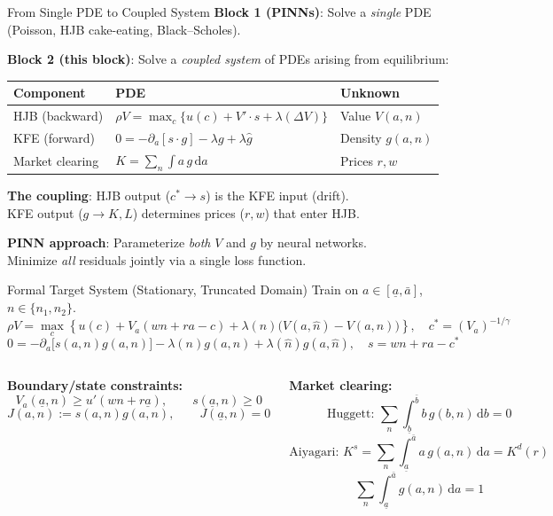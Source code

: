 \documentclass[aspectratio=169,11pt]{beamer}
\newcommand{\emphc}[1]{\textcolor{harvardcrimson}{#1}}
\newcommand{\ud}{\,\mathrm{d}}
\newcommand{\ubar}[1]{\underline{#1}}
\begin{document}
\begin{frame}{From Single PDE to Coupled System}
\small
\textbf{Block 1 (PINNs)}: Solve a \emph{single} PDE (Poisson, HJB cake-eating, Black--Scholes).

\vspace{0.2em}
\textbf{Block 2 (this block)}: Solve a \emph{coupled system} of PDEs arising from equilibrium:

\vspace{0.2em}
\begin{center}
\small
\renewcommand{\arraystretch}{1.3}
\begin{tabular}{lll}
\toprule
\textbf{Component} & \textbf{PDE} & \textbf{Unknown} \\
\midrule
HJB (backward) & $\rho V = \max_c\{u(c) + V'\cdot s + \lambda(\Delta V)\}$ & Value $V(a,n)$ \\
KFE (forward) & $0 = -\partial_a[s\cdot g] - \lambda g + \lambda\hat{g}$ & Density $g(a,n)$ \\
Market clearing & $K = \sum_n \int a\,g\ud a$ & Prices $r, w$ \\
\bottomrule
\end{tabular}
\end{center}

\vspace{0.2em}
\textbf{The coupling}: HJB output ($c^* \to s$) is the KFE input (drift).\\
KFE output ($g \to K, L$) determines prices ($r, w$) that enter HJB.

\vspace{0.2em}
\begin{center}
\colorbox{uzhgreylight}{\parbox{0.7\textwidth}{\centering\small
\textbf{PINN approach}: Parameterize \emph{both} $V$ and $g$ by neural networks.\\
Minimize \emph{all} residuals \emphc{jointly} via a single loss function.}}
\end{center}
\end{frame}

\begin{frame}{Formal Target System (Stationary, Truncated Domain)}
\footnotesize
Train on $a\in[\ubar{a},\bar{a}]$, $n\in\{n_1,n_2\}$.
\[
\rho V=\max_c\left\{u(c)+V_a(wn+ra-c)+\lambda(n)\big(V(a,\hat n)-V(a,n)\big)\right\},\quad
c^*=(V_a)^{-1/\gamma}
\]
\[
0=-\partial_a\!\big[s(a,n)g(a,n)\big]-\lambda(n)g(a,n)+\lambda(\hat n)g(a,\hat n),\quad
s=wn+ra-c^*
\]

\vspace{-0.2em}
\begin{columns}[T]
\textbf{Boundary/state constraints:}
\[
V_a(\ubar a,n)\ge u'(wn+r\ubar a),\qquad s(\ubar a,n)\ge 0
\]
\[
J(a,n):=s(a,n)g(a,n),\qquad J(\ubar a,n)=0
\]

\textbf{Market clearing:}
\[
\text{Huggett: }\sum_n\int_{\ubar b}^{\bar b} b\,g(b,n)\ud b = 0
\]
\[
\text{Aiyagari: }K^s=\sum_n\int_{\ubar a}^{\bar a} a\,g(a,n)\ud a=K^d(r)
\]
\[
\sum_n\int_{\ubar a}^{\bar a}g(a,n)\ud a=1
\]
\end{columns}
\end{frame}
\end{document}
